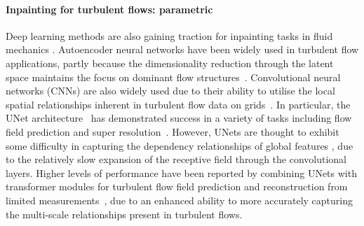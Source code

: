 \documentclass{article}
\begin{document}
\paragraph{Inpainting for turbulent flows: parametric}
Deep learning methods are also gaining traction for inpainting tasks in fluid mechanics \cite{vinuesa2023transformative,brunton2020machine}. Autoencoder neural networks have been widely used in turbulent flow applications, partly because the dimensionality reduction through the latent space maintains the focus on dominant flow structures~\cite{dubois2022machine,kumar2022state}. Convolutional neural networks (CNNs) are also widely used due to their ability to utilise the local spatial relationships inherent in turbulent flow data on grids~\cite{nguyen2024climatelearn,jin2018prediction,morimoto2021experimental}. In particular, the UNet architecture~\cite{ronneberger2015u} has demonstrated success in a variety of tasks including flow field prediction and super resolution~\cite{kaltenborn2023climateset,bao2023deep,zhang2023improved,deng2023temporal,ashkboos2022ens}. However, UNets are thought to exhibit some difficulty in capturing the dependency relationships of global features \cite{wang2018non}, due to the relatively slow expansion of the receptive field through the convolutional layers. 
Higher levels of performance have been reported by combining UNets with transformer modules for turbulent flow field prediction and reconstruction from limited measurements~\cite{kang2023new,jiang2023transcfd,xu2023estimation}, due to an enhanced ability to more accurately capturing the multi-scale relationships present in turbulent flows. 
\end{document}
